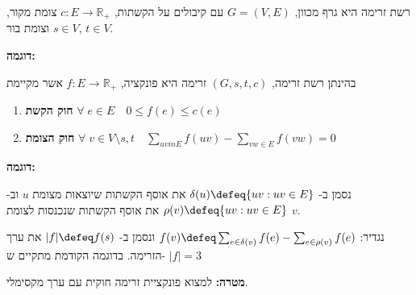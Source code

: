 \begin{definition}
רשת זרימה היא גרף מכוון, 
$G = (V, E)$ 
עם קיבולים על הקשתות,
$c:E \to \mathbb{R}_+$
צומת מקור,
$s \in V$
וצומת בור,
$t \in V$.
\end{definition}

\textbf{דוגמה:}

\begin{center}
\end{center}


\begin{definition}[זרימה]
בהינתן רשת זרימה,
$(G, s, t, c)$
זרימה היא פונקציה,
$f:E \to \mathbb{R_+}$
אשר מקיימת
\begin{enumerate}
\item
\textbf{חוק הקשת}
$\forall \; e \in E \hspace{1em} 0 \leq f(e) \leq c(e)$
\item
\textbf{חוק הצומת}
$\forall \; v \in V \setminus {s,t} \hspace{1em} 
\sum_{uv in E} f(uv) - \sum_{vw \in E} f(vw) = 0$
\end{enumerate}

\end{definition}

\textbf{דוגמה:}

\begin{center}
\end{center}

נסמן ב-%
$\delta(u) \defeq \{uv : uv \in E\}$
את אוסף הקשתות שיוצאות מצומת $u$ וב-%
$\rho(v) \defeq \{uv : uv \in E\}$
את אוסף הקשתות שנכנסות לצומת $v$.

נגדיר:
$f(v) \defeq \sum_{e \in \delta(v)} f(e) - \sum_{e \in \rho(v)} f(e)$
ונסמן ב-%
$|f| \defeq f(s)$
את ערך הזרימה.
בדוגמה הקודמת מתקיים ש-%
$|f| = 3$

\textbf{מטרה:}
למצוא פונקציית זרימה חוקית עם ערך מקסימלי.
